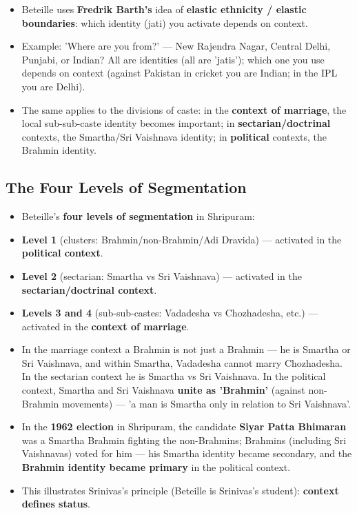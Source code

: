 \begin{KeyConcept}
\begin{itemize}
\item Beteille uses \textbf{Fredrik Barth's} idea of \textbf{elastic ethnicity / elastic boundaries}: which identity (jati) you activate depends on context.
\item Example: 'Where are you from?' --- New Rajendra Nagar, Central Delhi, Punjabi, or Indian? All are identities (all are 'jatis'); which one you use depends on context (against Pakistan in cricket you are Indian; in the IPL you are Delhi).
\item The same applies to the divisions of caste: in the \textbf{context of marriage}, the local sub-sub-caste identity becomes important; in \textbf{sectarian/doctrinal} contexts, the Smartha/Sri Vaishnava identity; in \textbf{political} contexts, the Brahmin identity.
\end{itemize}
\end{KeyConcept}

\subsection{The Four Levels of Segmentation}

\begin{KeyConcept}
\begin{itemize}
\item Beteille's \textbf{four levels of segmentation} in Shripuram:
\item \textbf{Level 1} (clusters: Brahmin/non-Brahmin/Adi Dravida) --- activated in the \textbf{political context}.
\item \textbf{Level 2} (sectarian: Smartha vs Sri Vaishnava) --- activated in the \textbf{sectarian/doctrinal context}.
\item \textbf{Levels 3 and 4} (sub-sub-castes: Vadadesha vs Chozhadesha, etc.) --- activated in the \textbf{context of marriage}.
\item In the marriage context a Brahmin is not just a Brahmin --- he is Smartha or Sri Vaishnava, and within Smartha, Vadadesha cannot marry Chozhadesha. In the sectarian context he is Smartha vs Sri Vaishnava. In the political context, Smartha and Sri Vaishnava \textbf{unite as 'Brahmin'} (against non-Brahmin movements) --- 'a man is Smartha only in relation to Sri Vaishnava'.
\end{itemize}
\end{KeyConcept}

\begin{ExampleBox}
\begin{itemize}
\item In the \textbf{1962 election} in Shripuram, the candidate \textbf{Siyar Patta Bhimaran} was a Smartha Brahmin fighting the non-Brahmins; Brahmins (including Sri Vaishnavas) voted for him --- his Smartha identity became secondary, and the \textbf{Brahmin identity became primary} in the political context.
\item This illustrates Srinivas's principle (Beteille is Srinivas's student): \textbf{context defines status}.
\end{itemize}
\end{ExampleBox}


